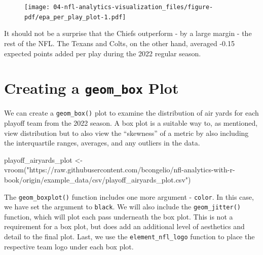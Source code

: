 \documentclass[
  letterpaper,
]{krantz}
\newenvironment{Shaded}{\begin{snugshade}}{\end{snugshade}}
\newcommand{\FunctionTok}[1]{\textcolor[rgb]{0.28,0.35,0.67}{#1}}
\newcommand{\NormalTok}[1]{\textcolor[rgb]{0.00,0.23,0.31}{#1}}
\newcommand{\OtherTok}[1]{\textcolor[rgb]{0.00,0.23,0.31}{#1}}
\newcommand{\StringTok}[1]{\textcolor[rgb]{0.13,0.47,0.30}{#1}}
\begin{document}
\begin{figure}[H]

{\centering \texttt{[image: 04-nfl-analytics-visualization\_files/figure-pdf/epa\_per\_play\_plot-1.pdf]}

}

\end{figure}

It should not be a surprise that the Chiefs outperform - by a large
margin - the rest of the NFL. The Texans and Colts, on the other hand,
averaged -0.15 expected points added per play during the 2022 regular
season.

\hypertarget{creating-a-geom_box-plot}{%
\section{\texorpdfstring{Creating a \texttt{geom\_box}
Plot}{Creating a geom\_box Plot}}\label{creating-a-geom_box-plot}}

We can create a \texttt{geom\_box()} plot to examine the distribution of
air yards for each playoff team from the 2022 season. A box plot is a
suitable way to, as mentioned, view distribution but to also view the
``skewness'' of a metric by also including the interquartile ranges,
averages, and any outliers in the data.

\begin{Shaded}
\begin{Highlighting}[]
\NormalTok{playoff\_airyards\_plot }\OtherTok{\textless{}{-}}
  \FunctionTok{vroom}\NormalTok{(}\StringTok{"https://raw.githubusercontent.com/bcongelio/nfl{-}analytics{-}with{-}r{-}book/origin/example\_data/csv/playoff\_airyards\_plot.csv"}\NormalTok{)}
\end{Highlighting}
\end{Shaded}

The \texttt{geom\_boxplot()} function includes one more argument -
\texttt{color}. In this case, we have set the argument to
\texttt{black}. We will also include the \texttt{geom\_jitter()}
function, which will plot each pass underneath the box plot. This is not
a requirement for a box plot, but does add an additional level of
aesthetics and detail to the final plot. Last, we use the
\texttt{element\_nfl\_logo} function to place the respective team logo
under each box plot.
\end{document}
